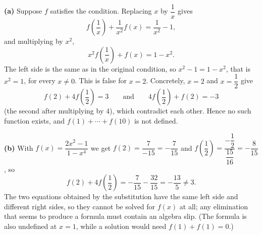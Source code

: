 \textbf{(a)} Suppose $f$ satisfies the condition. Replacing $x$ by $\dfrac{1}{x}$ gives
\[
f\left(\dfrac{1}{x}\right)+\dfrac{1}{x^2}f(x)=\dfrac{1}{x^2}-1 ,
\]
and multiplying by $x^2$,
\[
x^2f\left(\dfrac{1}{x}\right)+f(x)=1-x^2 .
\]
The left side is the same as in the original condition, so $x^2-1=1-x^2$, that is $x^2=1$, for every $x\ne0$. This is false for $x=2$. Concretely, $x=2$ and $x=\dfrac{1}{2}$ give
\[
f(2)+4f\left(\dfrac{1}{2}\right)=3\qquad\text{and}\qquad 4f\left(\dfrac{1}{2}\right)+f(2)=-3
\]
(the second after multiplying by $4$), which contradict each other. Hence no such function exists, and $f(1)+\cdots+f(10)$ is not defined.

\textbf{(b)} With $f(x)=\dfrac{2x^2-1}{1-x^4}$ we get $f(2)=\dfrac{7}{-15}=-\dfrac{7}{15}$ and $f\left(\dfrac{1}{2}\right)=\dfrac{-\dfrac{1}{2}}{\dfrac{15}{16}}=-\dfrac{8}{15}$, so
\[
f(2)+4f\left(\dfrac{1}{2}\right)=-\dfrac{7}{15}-\dfrac{32}{15}=-\dfrac{13}{5}\ne3 .
\]
The two equations obtained by the substitution have the same left side and different right sides, so they cannot be solved for $f(x)$ at all; any elimination that seems to produce a formula must contain an algebra slip. (The formula is also undefined at $x=1$, while a solution would need $f(1)+f(1)=0$.)
